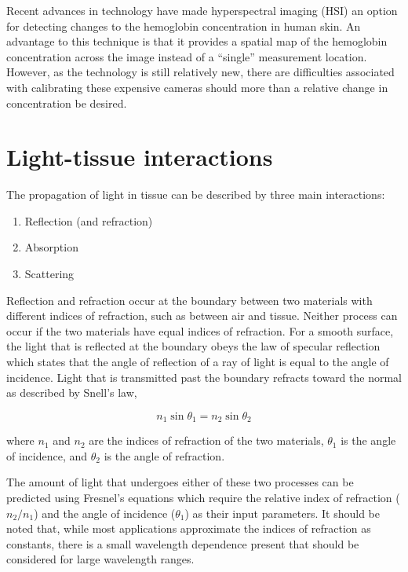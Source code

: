 Recent advances in technology have made hyperspectral imaging (HSI) an option for detecting changes to the hemoglobin concentration in human skin.\cite{Yudovsky2010,Chin2012} An advantage to this technique is that it provides a spatial map of the hemoglobin concentration across the image instead of a ``single'' measurement location. However, as the technology is still relatively new, there are difficulties associated with calibrating these expensive cameras should more than a relative change in concentration be desired.

\section{Light-tissue interactions}
The propagation of light in tissue can be described by three main interactions:\cite{Niemz2007}
\begin{enumerate}
	\item Reflection (and refraction)
	\item Absorption
	\item Scattering
\end{enumerate}

Reflection and refraction occur at the boundary between two materials with different indices of refraction, such as between air and tissue. Neither process can occur if the two materials have equal indices of refraction. For a smooth surface, the light that is reflected at the boundary obeys the law of specular reflection which states that the angle of reflection of a ray of light is equal to the angle of incidence.\cite{Knight2013} Light that is transmitted past the boundary refracts toward the normal as described by Snell's law,

\begin{equation}
n_1 \sin \theta_1 = n_2 \sin \theta_2
\end{equation}

\noindent where $n_1$ and $n_2$ are the indices of refraction of the two materials, $\theta_1$ is the angle of incidence, and $\theta_2$ is the angle of refraction.

The amount of light that undergoes either of these two processes can be predicted using Fresnel's equations which require the relative index of refraction ($n_2 / n_1$) and the angle of incidence ($\theta_1$) as their input parameters.\cite{Pedrotti1993} It should be noted that, while most applications approximate the indices of refraction as constants, there is a small wavelength dependence present that should be considered for large wavelength ranges.\cite{Knight2013}

